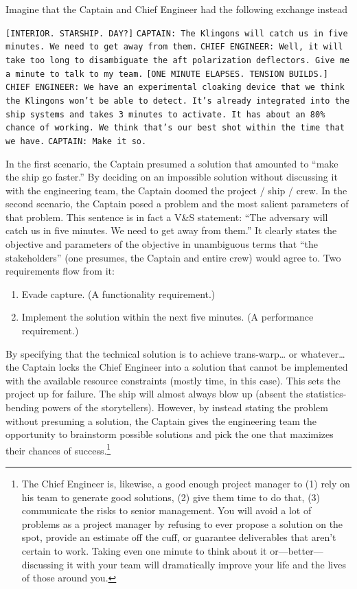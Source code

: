 \documentclass[12pt,oneside]{book}
\begin{document}
Imagine that the Captain and Chief Engineer had the following exchange instead
\begin{displayquote}
\hfill \break
\texttt{[INTERIOR. STARSHIP. DAY?]}
\hfill \break \hfill \break
\texttt{CAPTAIN: The Klingons will catch us in five minutes. We need to get away from them.}
\hfill \break \hfill \break
\texttt{CHIEF ENGINEER: Well, it will take too long to disambiguate the aft polarization deflectors. Give me a minute to talk to my team.}
\hfill \break
\texttt{[ONE MINUTE ELAPSES. TENSION BUILDS.]}
\hfill \break \hfill \break
\texttt{CHIEF ENGINEER: We have an experimental cloaking device that we think the Klingons won't be able to detect. It's already integrated into the ship systems and takes 3 minutes to activate. It has about an 80\% chance of working. We think that's our best shot within the time that we have.}
\hfill \break \hfill \break
\texttt{CAPTAIN: Make it so.}
\hfill \break
\end{displayquote}
\break
In the first scenario, the Captain presumed a solution that amounted to ``make the ship go faster.'' By deciding on an impossible solution without discussing it with the engineering team, the Captain doomed the project / ship / crew. In the second scenario, the Captain posed a problem and the most salient parameters of that problem. This sentence is in fact a V\&S statement: ``The adversary will catch us in five minutes. We need to get away from them.'' It clearly states the objective and parameters of the objective in unambiguous terms that ``the stakeholders'' (one presumes, the Captain and entire crew) would agree to. Two requirements flow from it:
\begin{enumerate}
\item Evade capture. (A functionality requirement.)
\item Implement the solution within the next five minutes. (A performance requirement.)
\end{enumerate}

By specifying that the technical solution is to achieve trans-warp{\ldots} or whatever{\ldots} the Captain locks the Chief Engineer into a solution that cannot be implemented with the available resource constraints (mostly time, in this case). This sets the project up for failure. The ship will almost always blow up (absent the statistics-bending powers of the storytellers). However, by instead stating the problem without presuming a solution, the Captain gives the engineering team the opportunity to brainstorm possible solutions and pick the one that maximizes their chances of success.\footnote{The Chief Engineer is, likewise, a good enough project manager to (1) rely on his team to generate good solutions, (2) give them time to do that, (3) communicate the risks to senior management. You will avoid a lot of problems as a project manager by refusing to ever propose a solution on the spot, provide an estimate off the cuff, or guarantee deliverables that aren't certain to work. Taking even one minute to think about it or---better---discussing it with your team will dramatically improve your life and the lives of those around you.}
\end{document}

